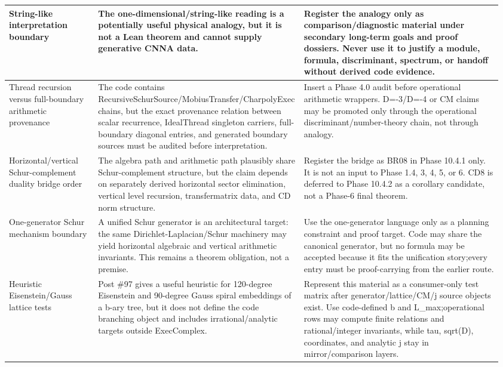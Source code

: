 \begin{longtable}{L{0.18\linewidth} L{0.38\linewidth} L{0.4\linewidth}}
\hline
\addlinespace[0.24em]
String-like interpretation boundary & The one-dimensional/\allowbreak{}string-like reading is a potentially useful physical analogy, but it is not a Lean theorem and cannot supply generative CNNA data. & Register the analogy only as comparison/\allowbreak{}diagnostic material under secondary long-term goals and proof dossiers. Never use it to justify a module, formula, discriminant, spectrum, or handoff without derived code evidence.\\
\hline
\addlinespace[0.24em]
Thread recursion versus full-boundary arithmetic provenance & The code contains RecursiveSchurSource/\allowbreak{}MobiusTransfer/\allowbreak{}CharpolyExec chains, but the exact provenance relation between scalar recurrence, IdealThread singleton carriers, full-boundary diagonal entries, and generated boundary sources must be audited before interpretation. & Insert a Phase 4.0 audit before operational arithmetic wrappers. D=-3/\allowbreak{}D=-4 or CM claims may be promoted only through the operational discriminant/\allowbreak{}number-theory chain, not through analogy.\\
\hline
\addlinespace[0.24em]
Horizontal/\allowbreak{}vertical Schur-complement duality bridge order & The algebra path and arithmetic path plausibly share Schur-complement structure, but the claim depends on separately derived horizontal sector elimination, vertical level recursion, transfermatrix data, and CD norm structure. & Register the bridge as BR08 in Phase 10.4.1 only. It is not an input to Phase 1.4, 3, 4, 5, or 6. CD8 is deferred to Phase 10.4.2 as a corollary candidate, not a Phase-6 final theorem.\\
\hline
\addlinespace[0.24em]
One-generator Schur mechanism boundary & A unified Schur generator is an architectural target: the same Dirichlet-Laplacian/\allowbreak{}Schur machinery may yield horizontal algebraic and vertical arithmetic invariants. This remains a theorem obligation, not a premise. & Use the one-generator language only as a planning constraint and proof target. Code may share the canonical generator, but no formula may be accepted because it fits the unification story;\newline every entry must be proof-carrying from the earlier route.\\
\hline
\addlinespace[0.24em]
Heuristic Eisenstein/\allowbreak{}Gauss lattice tests & Post \#97 gives a useful heuristic for 120-degree Eisenstein and 90-degree Gauss spiral embeddings of a b-ary tree, but it does not define the code branching object and includes irrational/\allowbreak{}analytic targets outside ExecComplex. & Represent this material as a consumer-only test matrix after generator/\allowbreak{}lattice/\allowbreak{}CM/\allowbreak{}j source objects exist. Use code-defined b and L\_max;\newline operational rows may compute finite relations and rational/\allowbreak{}integer invariants, while tau, sqrt(D), coordinates, and analytic j stay in mirror/\allowbreak{}comparison layers.\\

\end{longtable}
